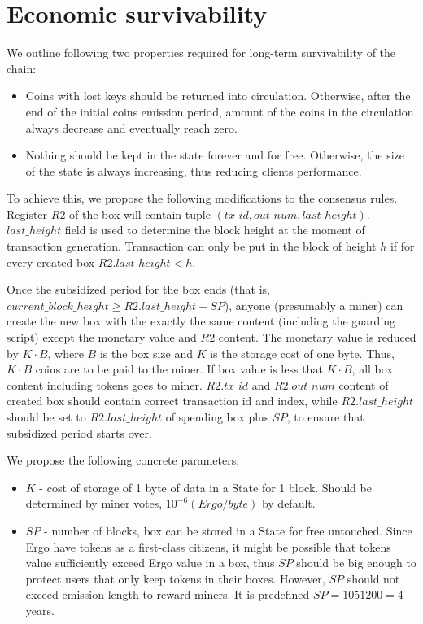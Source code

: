 \section{Economic survivability}

We outline following two properties required for long-term survivability of the chain:

\begin{itemize}
    \item{} Coins with lost keys should be returned into circulation.
    Otherwise, after the end of the initial coins emission period, amount of the coins
    in the circulation always decrease and eventually reach zero.
    \item{} Nothing should be kept in the state forever and for free.
    Otherwise, the size of the state is always increasing, thus reducing clients performance.
\end{itemize}

To achieve this, we propose the following modifications to the consensus rules.
Register $R2$ of the box will contain tuple $(tx\_id, out\_num,
last\_height)$. $last\_height$ field is used to determine the block height
at the moment of transaction generation. Transaction can only be put in the
block of height $h$ if for every created box $R2.last\_height < h$.

Once the subsidized period for the box ends (that is,
$current\_block\_height \ge R2.last\_height + SP$), anyone (presumably a miner) can
create the new box with the exactly the same content (including the guarding
script) except the monetary value and $R2$ content. The monetary value is
reduced by $K \cdot B$, where $B$ is the box size and $K$ is the storage cost of one byte.
Thus, $K \cdot B$ coins are to be paid to the miner.
If box value is less that $K \cdot B$, all box content including tokens goes to miner.
$R2.tx\_id$ and $R2.out\_num$ content of created box should contain correct transaction id
and index, while $R2.last\_height$ should be set to $R2.last\_height$ of spending box
plus $SP$, to ensure that subsidized period starts over.

We propose the following concrete parameters:
\begin{itemize}
    \item{} $K$ - cost of storage of 1 byte of data in a State for 1 block.
    Should be determined by miner votes, $10^{-6} (Ergo/byte)$ by default.
    \item{} $SP$ - number of blocks, box can be stored in a State for free untouched.
    Since Ergo have tokens as a first-class citizens, it might be possible that tokens value
    sufficiently exceed Ergo value in a box, thus $SP$ should be big enough to protect users
    that only keep tokens in their boxes.
    However, $SP$ should not exceed emission length to reward miners.
    It is predefined $SP = 1051200 = 4$ years.
\end{itemize}